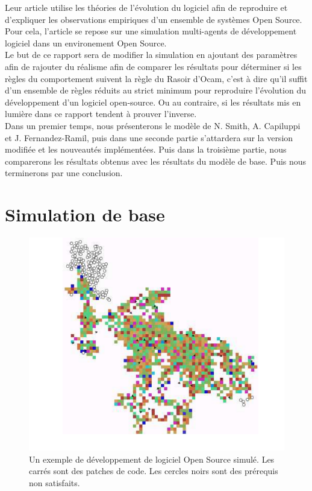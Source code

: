 \documentclass{article}
\begin{document}
Leur article utilise les théories de l'évolution du logiciel
afin de reproduire et d'expliquer les observations empiriques d'un ensemble
de systèmes Open Source. Pour cela, l'article se repose sur une simulation multi-agents de
développement logiciel dans un environement Open Source.
\\

Le but de ce rapport sera de modifier la simulation en ajoutant des
paramètres afin de rajouter du réalisme afin de comparer les résultats pour
déterminer si les règles du comportement suivent la règle du Rasoir d'Ocam, c'est à dire
qu'il suffit d'un ensemble de règles réduits au strict minimum pour reproduire l'évolution du
développement d'un logiciel open-source. Ou au contraire, si les résultats mis en lumière dans
ce rapport tendent à prouver l'inverse.
\\

Dans un premier temps, nous présenterons le modèle de N. Smith, A. Capiluppi et J. Fernandez-Ramil,
puis dans une seconde partie s'attardera sur la version modifiée et les nouveautés implémentées. Puis
dans la troisième partie, nous comparerons les résultats obtenus avec les résultats du modèle de base.
Puis nous terminerons par une conclusion.

\newpage

\section{Simulation de base}

\begin{figure}[H]
 \centerline{\includegraphics[scale=0.45]{pictures/Image0.png}}
\caption{Un exemple de développement de logiciel Open Source
  simulé. Les carrés sont des patches de code. Les cercles noirs
  sont des prérequis non satisfaits.}
 \end{figure}
\end{document}
